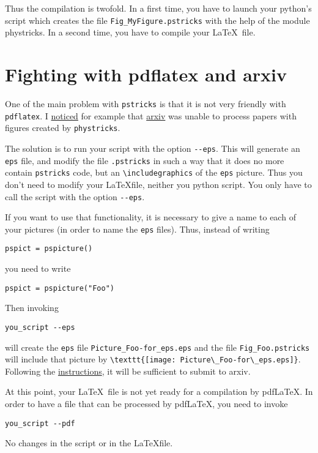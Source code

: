 Thus the compilation is twofold. In a first time, you have to launch your python's script which creates the file \verb+Fig_MyFigure.pstricks+ with the help of the module phystricks. In a second time, you have to compile your \LaTeX\ file.


\section{Fighting with pdflatex and arxiv}

One of the main problem with \verb+pstricks+ is that it is not very friendly with \verb+pdflatex+. I \href{http://arxiv.org/abs/0912.2267}{noticed} for example that \href{www.arxiv.org}{arxiv} was unable to process papers with figures created by \verb+phystricks+.

The solution is to run your script with the option \verb+--eps+. This will generate an \verb+eps+ file, and modify the file \verb+.pstricks+ in such a way that it does no more contain \verb+pstricks+ code, but an \verb+\includegraphics+ of the \verb+eps+ picture. Thus you don't need to modify your \LaTeX file, neither you python script. You only have to call the script with the option \verb+--eps+.

If you want to use that functionality, it is necessary to give a name to each of your pictures (in order to name the \verb+eps+ files). Thus, instead of writing
\begin{verbatim}
pspict = pspicture()
\end{verbatim}
you need to write
\begin{verbatim}
pspict = pspicture("Foo")
\end{verbatim}

Then invoking
\begin{verbatim}
you_script --eps
\end{verbatim}
will create the \verb+eps+ file \verb+Picture_Foo-for_eps.eps+ and the file \verb+Fig_Foo.pstricks+ will include that picture by \verb+\texttt{[image: Picture\_Foo-for\_eps.eps]}+. Following the \href{http://arxiv.org/help/submit\_tex}{instructions}, it will be sufficient to submit to arxiv.

At this point, your \LaTeX\ file is not yet ready for a compilation by pdf\LaTeX. In order to have a file that can be processed by pdf\LaTeX, you need to invoke
\begin{verbatim}
you_script --pdf
\end{verbatim}
No changes in the script or in the \LaTeX file.


